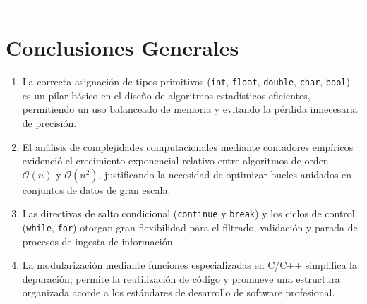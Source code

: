 \documentclass[12pt]{article}
\begin{document}
\vspace{5mm}
\hrule
\newpage

\section*{Conclusiones Generales}

\begin{enumerate}
    \item La correcta asignación de tipos primitivos (\texttt{int}, \texttt{float}, \texttt{double}, \texttt{char}, \texttt{bool}) es un pilar básico en el diseño de algoritmos estadísticos eficientes, permitiendo un uso balanceado de memoria y evitando la pérdida innecesaria de precisión.
    \item El análisis de complejidades computacionales mediante contadores empíricos evidenció el crecimiento exponencial relativo entre algoritmos de orden $\mathcal{O}(n)$ y $\mathcal{O}(n^2)$, justificando la necesidad de optimizar bucles anidados en conjuntos de datos de gran escala.
    \item Las directivas de salto condicional (\texttt{continue} y \texttt{break}) y los ciclos de control (\texttt{while}, \texttt{for}) otorgan gran flexibilidad para el filtrado, validación y parada de procesos de ingesta de información.
    \item La modularización mediante funciones especializadas en C/C++ simplifica la depuración, permite la reutilización de código y promueve una estructura organizada acorde a los estándares de desarrollo de software profesional.
\end{enumerate}
\end{document}
